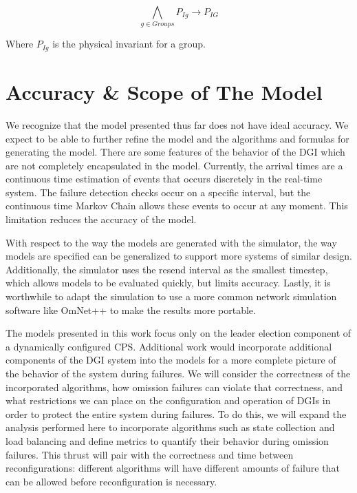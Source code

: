 \begin{equation}
\bigwedge_{g \in Groups}P_{Ig} \rightarrow P_{IG}
\end{equation}

Where $P_{Ig}$ is the physical invariant for a group.

\section{Accuracy & Scope of The Model}

We recognize that the model presented thus far does not have ideal accuracy.
We expect to be able to further refine the model and the algorithms and formulas for generating the model.
There are some features of the behavior of the DGI which are not completely encapsulated in the model.
Currently, the arrival times are a continuous time estimation of events that occurs discretely in the real-time system.
The failure detection checks occur on a specific interval, but the continuous time Markov Chain allows these events to occur at any moment.
This limitation reduces the accuracy of the model.

With respect to the way the models are generated with the simulator, the way models are specified can be generalized to support more systems of similar design.
Additionally, the simulator uses the resend interval as the smallest timestep, which allows models to be evaluated quickly, but limits accuracy.
Lastly, it is worthwhile to adapt the simulation to use a more common network simulation software like OmNet++ to make the results more portable.

The models presented in this work focus only on the leader election component of a dynamically configured CPS. Additional work would incorporate additional components of the DGI system into the models for a more complete picture of the behavior of the system during failures. We will consider the correctness of the incorporated algorithms, how omission failures can violate that correctness, and what restrictions we can place on the configuration and operation of DGIs in order to protect the entire system during failures. To do this, we will expand the analysis performed here to incorporate algorithms such as state collection and load balancing and define metrics to quantify their behavior during omission failures. This thrust will pair with the correctness and time between reconfigurations: different algorithms will have different amounts of failure that can be allowed before reconfiguration is necessary.


